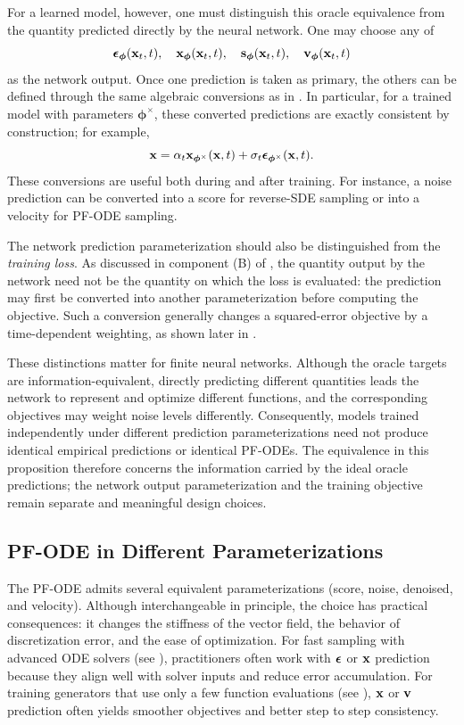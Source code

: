 For a learned model, however, one must distinguish this oracle equivalence
from the quantity predicted directly by the neural network. One may choose
any of
\[
\bm{\epsilon}_{\bm{\phi}}({\mathbf{x}}_t,t),
\quad
{\mathbf{x}}_{\bm{\phi}}({\mathbf{x}}_t,t),
\quad
{\mathbf{s}}_{\bm{\phi}}({\mathbf{x}}_t,t),
\quad
{\mathbf{v}}_{\bm{\phi}}({\mathbf{x}}_t,t)
\]
as the network output. Once one prediction is taken as primary, the others
can be defined through the same algebraic conversions as in
. In particular, for a trained model with
parameters $\bm{\phi}^\times$, these converted predictions are exactly
consistent by construction; for example,
\[
{\mathbf{x}}
=
\alpha_t
{\mathbf{x}}_{\bm{\phi}^\times}({\mathbf{x}},t)
+
\sigma_t
{\bm{\epsilon}}_{\bm{\phi}^\times}({\mathbf{x}},t).
\]
These conversions are useful both during and after training. For instance,
a noise prediction can be converted into a score for reverse-SDE sampling
or into a velocity for PF-ODE sampling.

The network prediction parameterization should also be distinguished from
the \emph{training loss}. As discussed in component (B) of
, the quantity output by the network need not be
the quantity on which the loss is evaluated: the prediction may first be
converted into another parameterization before computing the objective.
Such a conversion generally changes a squared-error objective by a
time-dependent weighting, as shown later in .

These distinctions matter for finite neural networks. Although the oracle
targets are information-equivalent, directly predicting different quantities
leads the network to represent and optimize different functions, and the
corresponding objectives may weight noise levels differently. Consequently,
models trained independently under different prediction parameterizations
need not produce identical empirical predictions or identical PF-ODEs.
The equivalence in this proposition therefore concerns the information
carried by the ideal oracle predictions; the network output parameterization
and the training objective remain separate and meaningful design choices.


\subsection{PF-ODE in Different Parameterizations}\label{subsec:pf-ode-different-para} 
The PF-ODE admits several equivalent parameterizations (score, noise, denoised, and velocity). 
Although interchangeable in principle, the choice has practical consequences: it changes the stiffness of the vector field, the behavior of discretization error, and the ease of optimization.
For fast sampling with advanced ODE solvers (see ), practitioners often work with ${\bm{\epsilon}}$ or ${\mathbf{x}}$ prediction because they align well with solver inputs and reduce error accumulation.
For training generators that use only a few function evaluations (see ), ${\mathbf{x}}$ or ${\mathbf{v}}$ prediction often yields smoother objectives and better step to step consistency.


